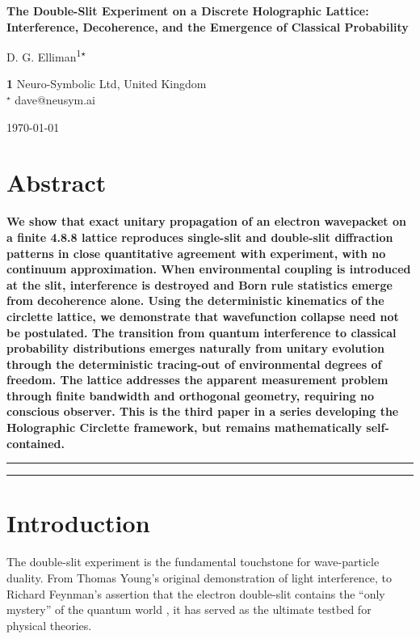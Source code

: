 \documentclass[submission, Phys]{SciPost}
\begin{document}
\begin{center}{\Large \textbf{
The Double-Slit Experiment on a Discrete Holographic Lattice:\\ Interference, Decoherence, and the Emergence of Classical Probability
}}\end{center}

\begin{center}
D. G. Elliman\textsuperscript{1$\star$}
\end{center}

\begin{center}
{\bf 1} Neuro-Symbolic Ltd, United Kingdom
\\
${}^\star$ dave@neusym.ai
\end{center}

\begin{center}
\today
\end{center}

\section*{Abstract}
{\bf
We show that exact unitary propagation of an electron wavepacket on a finite 4.8.8 lattice reproduces single-slit and double-slit diffraction patterns in close quantitative agreement with experiment, with no continuum approximation. When environmental coupling is introduced at the slit, interference is destroyed and Born rule statistics emerge from decoherence alone. Using the deterministic kinematics of the circlette lattice, we demonstrate that wavefunction collapse need not be postulated. The transition from quantum interference to classical probability distributions emerges naturally from unitary evolution through the deterministic tracing-out of environmental degrees of freedom. The lattice addresses the apparent measurement problem through finite bandwidth and orthogonal geometry, requiring no conscious observer. This is the third paper in a series developing the Holographic Circlette framework, but remains mathematically self-contained.
}

\vspace{10pt}
\noindent\rule{\textwidth}{1pt}
\tableofcontents\thispagestyle{fancy}
\noindent\rule{\textwidth}{1pt}
\vspace{10pt}

\section{Introduction}
\label{sec:intro}
The double-slit experiment is the fundamental touchstone for wave-particle duality. From Thomas Young's original demonstration of light interference, to Richard Feynman's assertion that the electron double-slit contains the ``only mystery'' of the quantum world \cite{feynman1965}, it has served as the ultimate testbed for physical theories.
\end{document}

